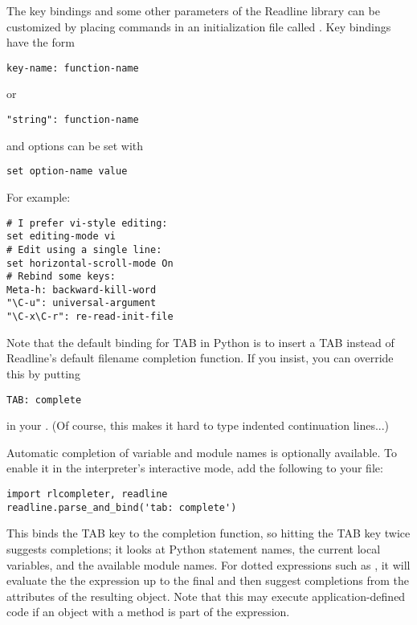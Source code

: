 \documentclass{manual}
\begin{document}
The key bindings and some other parameters of the Readline library can
be customized by placing commands in an initialization file called
.  Key bindings have the form

\begin{verbatim}
key-name: function-name
\end{verbatim}

or

\begin{verbatim}
"string": function-name
\end{verbatim}

and options can be set with

\begin{verbatim}
set option-name value
\end{verbatim}

For example:

\begin{verbatim}
# I prefer vi-style editing:
set editing-mode vi
# Edit using a single line:
set horizontal-scroll-mode On
# Rebind some keys:
Meta-h: backward-kill-word
"\C-u": universal-argument
"\C-x\C-r": re-read-init-file
\end{verbatim}

Note that the default binding for TAB in Python is to insert a TAB
instead of Readline's default filename completion function.  If you
insist, you can override this by putting

\begin{verbatim}
TAB: complete
\end{verbatim}

in your .  (Of course, this makes it hard to type
indented continuation lines...)

Automatic completion of variable and module names is optionally
available.  To enable it in the interpreter's interactive mode, add
the following to your  file:%
%
%

\begin{verbatim}
import rlcompleter, readline
readline.parse_and_bind('tab: complete')
\end{verbatim}

This binds the TAB key to the completion function, so hitting the TAB
key twice suggests completions; it looks at Python statement names,
the current local variables, and the available module names.  For
dotted expressions such as , it will evaluate the the
expression up to the final  and then suggest completions
from the attributes of the resulting object.  Note that this may
execute application-defined code if an object with a
 method is part of the expression.
\end{document}
